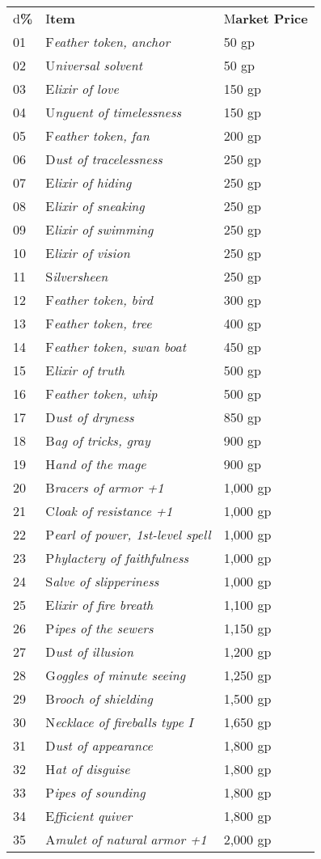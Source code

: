 \documentclass{article}
\begin{document}
\vspace{12pt}
\begin{tabular}{|>{\raggedright}p{14pt}|>{\raggedright}p{191pt}|>{\raggedright}p{55pt}|}
\hline
\multicolumn{3}{|p{261pt}|}{T\textbf{able: Minor Wondrous Items}}\tabularnewline
\hline
d\textbf{\%} & I\textbf{tem} & M\textbf{arket Price}\tabularnewline
\hline
01 & F\textit{eather token, anchor} & 50 gp\tabularnewline
\hline
02 & U\textit{niversal solvent} & 50 gp\tabularnewline
\hline
03 & E\textit{lixir of love} & 150 gp\tabularnewline
\hline
04 & U\textit{nguent of timelessness} & 150 gp\tabularnewline
\hline
05 & F\textit{eather token, fan} & 200 gp\tabularnewline
\hline
06 & D\textit{ust of tracelessness} & 250 gp\tabularnewline
\hline
07 & E\textit{lixir of hiding} & 250 gp\tabularnewline
\hline
08 & E\textit{lixir of sneaking} & 250 gp\tabularnewline
\hline
09 & E\textit{lixir of swimming} & 250 gp\tabularnewline
\hline
10 & E\textit{lixir of vision} & 250 gp\tabularnewline
\hline
11 & S\textit{ilversheen} & 250 gp\tabularnewline
\hline
12 & F\textit{eather token, bird} & 300 gp\tabularnewline
\hline
13 & F\textit{eather token, tree} & 400 gp\tabularnewline
\hline
14 & F\textit{eather token, swan boat} & 450 gp\tabularnewline
\hline
15 & E\textit{lixir of truth} & 500 gp\tabularnewline
\hline
16 & F\textit{eather token, whip} & 500 gp\tabularnewline
\hline
17 & D\textit{ust of dryness} & 850 gp\tabularnewline
\hline
18 & B\textit{ag of tricks, gray} & 900 gp\tabularnewline
\hline
19 & H\textit{and of the mage} & 900 gp\tabularnewline
\hline
20 & B\textit{racers of armor +1} & 1,000 gp\tabularnewline
\hline
21 & C\textit{loak of resistance +1} & 1,000 gp\tabularnewline
\hline
22 & P\textit{earl of power, 1st-level spell} & 1,000 gp\tabularnewline
\hline
23 & P\textit{hylactery of faithfulness} & 1,000 gp\tabularnewline
\hline
24 & S\textit{alve of slipperiness} & 1,000 gp\tabularnewline
\hline
25 & E\textit{lixir of fire breath} & 1,100 gp\tabularnewline
\hline
26 & P\textit{ipes of the sewers} & 1,150 gp\tabularnewline
\hline
27 & D\textit{ust of illusion} & 1,200 gp\tabularnewline
\hline
28 & G\textit{oggles of minute seeing} & 1,250 gp\tabularnewline
\hline
29 & B\textit{rooch of shielding} & 1,500 gp\tabularnewline
\hline
30 & N\textit{ecklace of fireballs type I} & 1,650 gp\tabularnewline
\hline
31 & D\textit{ust of appearance} & 1,800 gp\tabularnewline
\hline
32 & H\textit{at of disguise} & 1,800 gp\tabularnewline
\hline
33 & P\textit{ipes of sounding} & 1,800 gp\tabularnewline
\hline
34 & E\textit{fficient quiver} & 1,800 gp\tabularnewline
\hline
35 & A\textit{mulet of natural armor +1} & 2,000 gp\tabularnewline

\end{tabular}
\end{document}
